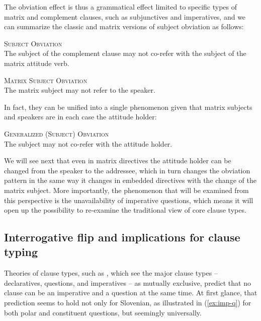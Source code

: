 \documentclass[output=paper,colorlinks,citecolor=brown]{langscibook}
\begin{document}
\noindent The obviation effect is thus a grammatical effect limited to specific types of matrix and complement clauses, such as subjunctives and imperatives, and we can summarize the classic and matrix versions of subject obviation as follows:

\eanoraggedright \textsc{Subject Obviation}\\
The subject of the complement clause may not co-refer with the subject of the matrix attitude verb.
\z

\eanoraggedright \textsc{Matrix Subject Obviation}\\
The matrix subject may not refer to the speaker.
\z

\noindent In fact, they can be unified into a single phenomenon \citep[][]{Stegovec2017,stegovec19} given that matrix subjects and speakers are in each case the attitude holder:

\eanoraggedright {}\textsc{Generalized (Subject) Obviation}\\
The subject may not co-refer with the attitude holder.
\z   

\noindent We will see next that even in matrix directives the attitude holder can be changed from the speaker to the addressee, which in turn changes the obviation pattern in the same way it changes in embedded directives with the change of the matrix subject. More importantly, the phenomenon that will be examined from this perspective is the unavailability of imperative questions, which means it will open up the possibility to re-examine the traditional view of core clause types.  

\subsection{Interrogative flip and implications for clause typing}
\label{subsec:typing}


Theories of clause types, such as , which see the major clause types -- declaratives, questions, and imperatives -- as mutually exclusive, predict that no clause can be an imperative and a question at the same time. At first glance, that prediction seems to hold not only for Slovenian, as illustrated in (\ref{ex:imp-q}) for both polar and constituent questions, but seemingly universally.
\end{document}

